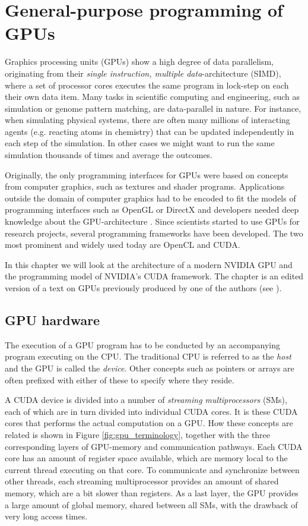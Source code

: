 \chapter{General-purpose programming of GPUs}
\label{chap:gpgpu}
Graphics processing units (GPUs) show a high degree of data
parallelism, originating from their \textit{single instruction,
  multiple data}-architecture (SIMD), where a set of processor cores
executes the same program in lock-step on each their own data
item. Many tasks in scientific computing and engineering, such as
simulation or genome pattern matching, are data-parallel in
nature. For instance, when simulating physical systems, there are
often many millions of interacting agents (e.g. reacting atoms in
chemistry) that can be updated independently in each step of the
simulation. In other cases we might want to run the same simulation
thousands of times and average the outcomes.

Originally, the only programming interfaces for GPUs were based on
concepts from computer graphics, such as textures and shader
programs. Applications outside the domain of computer graphics had to
be encoded to fit the models of programming interfaces such as OpenGL
or DirectX and developers needed deep knowledge about the
GPU-architecture \cite{nvidia2009fermi}. Since scientists started to
use GPUs for research projects, several programming frameworks have
been developed. The two most prominent and widely used today are
OpenCL and CUDA.

In this chapter we will look at the architecture of a modern NVIDIA
GPU and the programming model of NVIDIA's CUDA framework. The chapter
is an edited version of a text on GPUs previously produced by one of
the authors (see \cite{dybdal2011opencl}).

\section{GPU hardware}
\label{sec:gpu_hardware}
The execution of a GPU program has to be conducted by an accompanying
program executing on the CPU. The traditional CPU is referred to as
the \textit{host} and the GPU is called the \textit{device}. Other
concepts such as pointers or arrays are often prefixed with either of
these to specify where they reside.

A CUDA device is divided into a number of \textit{streaming
  multiprocessors} (SMs), each of which are in turn divided into
individual CUDA cores. It is these CUDA cores that performs the actual
computation on a GPU. How these concepts are related is shown in
Figure \ref{fig:gpu_terminology}, together with the three
corresponding layers of GPU-memory and communication pathways. Each
CUDA core has an amount of register space available, which are memory
local to the current thread executing on that core. To communicate and
synchronize between other threads, each streaming multiprocessor
provides an amount of shared memory, which are a bit slower than
registers. As a last layer, the GPU provides a large amount of global
memory, shared between all SMs, with the drawback of very long access
times.

